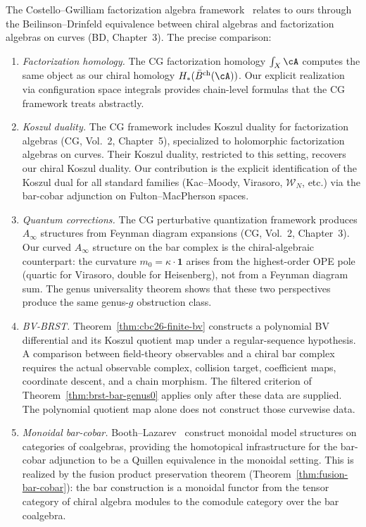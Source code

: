 \begin{remark}\label{rem:cg-comparison}
The Costello--Gwilliam factorization algebra framework~\cite{CG17}
relates to ours through the Beilinson--Drinfeld equivalence between
chiral algebras and factorization algebras on curves (BD, Chapter~3).
The precise comparison:
\begin{enumerate}[label=(\roman*)]
\item \emph{Factorization homology.}
  The CG factorization homology $\int_X \cA$ computes the same object
  as our chiral homology $H_*(\bar{B}^{\mathrm{ch}}(\cA))$.  Our explicit
  realization via configuration space integrals provides chain-level
  formulas that the CG framework treats abstractly.
\item \emph{Koszul duality.}
  The CG framework includes Koszul duality for factorization algebras
  (CG, Vol.~2, Chapter~5), specialized to holomorphic factorization
  algebras on curves.  Their Koszul duality, restricted to this setting,
  recovers our chiral Koszul duality.  Our contribution is the explicit
  identification of the Koszul dual for all standard families
  (Kac--Moody, Virasoro, $\mathcal{W}_N$, etc.) via the bar-cobar
  adjunction on Fulton--MacPherson spaces.
\item \emph{Quantum corrections.}
  The CG perturbative quantization framework produces $A_\infty$
  structures from Feynman diagram expansions (CG, Vol.~2, Chapter~3).
  Our curved $A_\infty$ structure on the bar complex is the
  chiral-algebraic counterpart: the curvature $m_0 = \kappa \cdot
  \mathbf{1}$ arises from the highest-order OPE pole (quartic for
  Virasoro, double for Heisenberg), not from a Feynman diagram sum.
  The genus universality theorem shows that these two perspectives
  produce the same genus-$g$ obstruction class.
\item \emph{BV-BRST.}
  Theorem~\ref{thm:cbc26-finite-bv} constructs a polynomial BV differential and its Koszul quotient map under a regular-sequence hypothesis.
  A comparison between field-theory observables and a chiral bar complex requires the actual observable complex, collision target, coefficient maps, coordinate descent, and a chain morphism.
  The filtered criterion of Theorem~\ref{thm:brst-bar-genus0} applies only after these data are supplied.
  The polynomial quotient map alone does not construct those curvewise data.
\item \emph{Monoidal bar-cobar.}
  Booth--Lazarev~\cite{BL24} construct monoidal model structures on
  categories of coalgebras, providing the homotopical infrastructure
  for the bar-cobar adjunction to be a Quillen equivalence in the
  monoidal setting.  This is realized by the fusion product preservation theorem
  (Theorem~\ref{thm:fusion-bar-cobar}): the bar construction
  is a monoidal functor from the tensor category of chiral
  algebra modules to the comodule category over the bar coalgebra.
\end{enumerate}
\end{remark}

